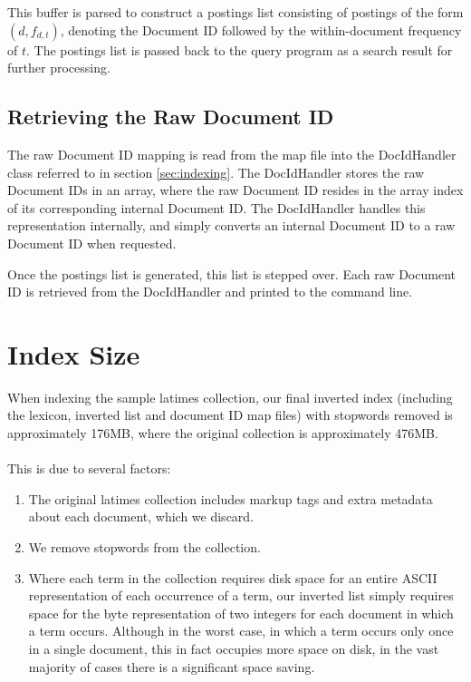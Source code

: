 This buffer is parsed to construct a postings list consisting of postings of the form $(d, f_{d,t})$, denoting the Document ID followed by the within-document frequency of $t$. The postings list is passed back to the query program as a search result for further processing.

\subsection*{Retrieving the Raw Document ID}

The raw Document ID mapping is read from the map file into the DocIdHandler class referred to in section \ref{sec:indexing}. The DocIdHandler stores the raw Document IDs in an array, where the raw Document ID resides in the array index of its corresponding internal Document ID.
The DocIdHandler handles this representation internally, and simply converts an internal Document ID to a raw Document ID when requested.

Once the postings list is generated, this list is stepped over. Each raw Document ID is retrieved from the DocIdHandler and printed to the command line.


\section{Index Size}
\label{sec:indexsize}

When indexing the sample latimes collection, our final inverted index (including the lexicon, inverted list and document ID map files) with stopwords removed is approximately 176MB, where the original collection is approximately 476MB.

\paragraph{}
This is due to several factors:

\begin{enumerate}
	\item The original latimes collection includes markup tags and extra metadata about each document, which we discard.
	\item We remove stopwords from the collection.
	\item Where each term in the collection requires disk space for an entire ASCII representation of each occurrence of a term, our inverted list simply requires space for the byte representation of two integers for each document in which a term occurs. Although in the worst case, in which a term occurs only once in a single document, this in fact occupies more space on disk, in the vast majority of cases there is a significant space saving.
\end{enumerate}